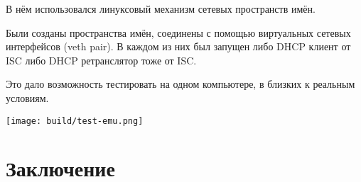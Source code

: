 \documentclass[12pt]{article}
\begin{document}
В нём использовался линуксовый механизм сетевых пространств имён.

Были созданы пространства имён, соединены с помощью виртуальных сетевых интерфейсов (veth pair). В каждом из них был запущен либо DHCP клиент от ISC либо DHCP ретранслятор тоже от ISC.

Это дало возможность тестировать на одном компьютере, в близких к реальным условиям.

\texttt{[image: build/test-emu.png]}

\pagebreak
\section{Заключение}
\end{document}
